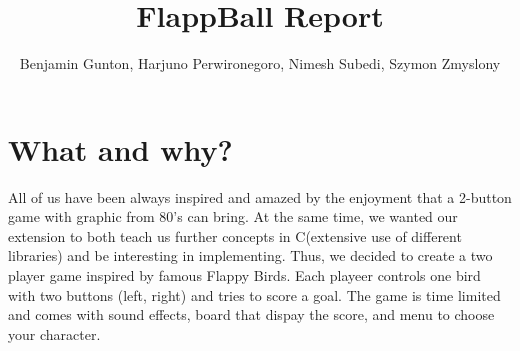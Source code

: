 \documentclass[11pt]{article}
\begin{document}
\title{FlappBall Report}
\author{Benjamin Gunton, Harjuno Perwironegoro, Nimesh Subedi, Szymon Zmyslony}

\maketitle

\section{What and why?}
All of us have been always inspired and amazed by the enjoyment that a 2-button game with graphic from 80's can bring. At the same time, we wanted our extension to both teach us further concepts in C(extensive use of different libraries) and be interesting in implementing. Thus, we decided to create a two player game inspired by famous Flappy Birds. Each playeer controls one bird with two buttons (left, right) and tries to score a goal. The game is time limited and comes with sound effects, board that dispay the score, and menu to choose your character.
\end{document}
